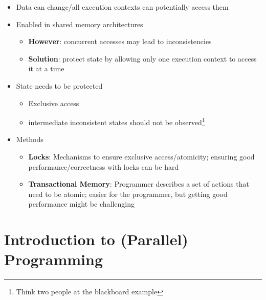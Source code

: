 \documentclass[a4paper]{article}
\begin{document}
\begin{itemize}
\begin{itemize}
\begin{itemize}
\item Data can change/all execution contexts can potentially access them
\item Enabled in shared memory architectures
\begin{itemize}
\item \textbf{However}: concurrent accesses may lead to inconsistencies
\item \textbf{Solution}: protect state by allowing only one execution context to access it at a time
\end{itemize}
\item State needs to be protected
\begin{itemize}
\item Exclusive access
\item intermediate inconsistent states should not be observed\footnote{Think two people at the blackboard example}
\end{itemize}
\item Methods
\begin{itemize}
\item \textbf{Locks}: Mechanisms to ensure exclusive access/atomicity; ensuring good performance/correctness with locks can be hard
\item \textbf{Transactional Memory}: Programmer describes a set of actions that need to be atomic; easier for the programmer, but getting good performance might be challenging
\end{itemize}
\end{itemize}
\end{itemize}
\end{itemize}

\section{Introduction to (Parallel) Programming}
\end{document}
